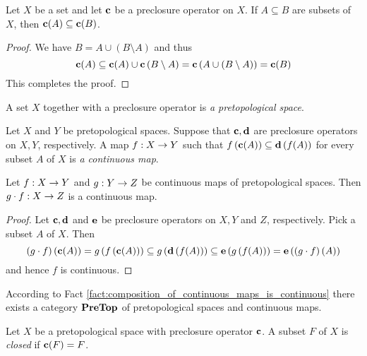 \begin{fact}\label{fact:preclosure_operator_is_monotone}
	Let $X$ be a set and let $\mathbf{c}$ be a preclosure operator on $X$. If $A\subseteq B$ are subsets of $X$, then $\mathbf{c}(A) \subseteq \mathbf{c}(B)$.
\end{fact}
\begin{proof}
	We have $B = A\cup \left(B\setminus A\right)$ and thus
	$$\mathbf{c}(A) \subseteq \mathbf{c}(A) \cup \mathbf{c}\left(B\setminus A\right) = \mathbf{c}\left(A \cup \left(B\setminus A\right) \right) = \mathbf{c}(B)$$
	This completes the proof.
\end{proof}

\begin{definition}
	A set $X$ together with a preclosure operator is \textit{a pretopological space}.
\end{definition}

\begin{definition}
	Let $X$ and $Y$ be pretopological spaces. Suppose that $\mathbf{c},\mathbf{d}$ are preclosure operators on $X,Y$, respectively. A map $f:X\rightarrow Y$ such that $f\left(\mathbf{c}(A)\right) \subseteq \mathbf{d}\left(f(A)\right)$ for every subset $A$ of $X$ is \textit{a continuous map}.
\end{definition}

\begin{fact}\label{fact:composition_of_continuous_maps_is_continuous}
	Let $f:X \rightarrow Y$ and $g:Y \rightarrow Z$ be continuous maps of pretopological spaces. Then $g\cdot f:X\rightarrow Z$ is a continuous map.
\end{fact}
\begin{proof}
	Let $\mathbf{c},\mathbf{d}$ and $\mathbf{e}$ be preclosure operators on $X,Y$ and $Z$, respectively. Pick a subset $A$ of $X$. Then
	$$\left(g\cdot f\right)\left(\mathbf{c}(A)\right) = g\left(f\left(\mathbf{c}(A)\right)\right) \subseteq g\left(\mathbf{d}\left(f(A)\right)\right) \subseteq \mathbf{e}\left(g\left(f(A)\right)\right) = \mathbf{e}\left(\left(g\cdot f\right)(A)\right)$$
	and hence $f$ is continuous.
\end{proof}
\noindent
According to Fact \ref{fact:composition_of_continuous_maps_is_continuous} there exists a category $\mathbf{PreTop}$ of pretopological spaces and continuous maps.

\begin{definition}
	Let $X$ be a pretopological space with preclosure operator $\mathbf{c}$. A subset $F$ of $X$ is \textit{closed} if $\mathbf{c}(F) = F$.
\end{definition}

